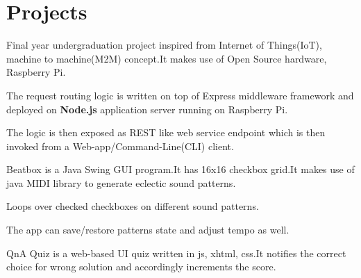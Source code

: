 \documentclass[]{deedy-resume-openfont}
\begin{document}
\begin{minipage}[t]{0.66\textwidth}
\section{Projects}
\descript{}
\begin{tightemize}
\item Final year undergraduation project inspired from Internet of Things(IoT), machine to machine(M2M)
  concept.It makes use of Open Source hardware, Raspberry Pi.
\item The request routing logic is written on top of Express middleware
  framework and deployed on \textbf{Node.js }application server running on
  Raspberry Pi.
\item The logic is then exposed as REST like web service endpoint which is then
  invoked from a Web-app/Command-Line(CLI) client.
\end{tightemize}
\sectionsep

\descript{}
\begin{tightemize}
\item Beatbox is a Java Swing GUI program.It has 16x16 checkbox grid.It makes
  use of java MIDI library to generate eclectic sound patterns.
\item Loops over checked checkboxes on different sound patterns.
\item The app can save/restore patterns state and adjust tempo as well.
\end{tightemize}
\sectionsep

\descript{}
\begin{tightemize}
\item QnA Quiz is a web-based UI quiz written in js, xhtml, css.It notifies
  the correct choice for wrong solution and accordingly increments the score.
\end{tightemize}
\sectionsep


\end{minipage}
\end{document}

